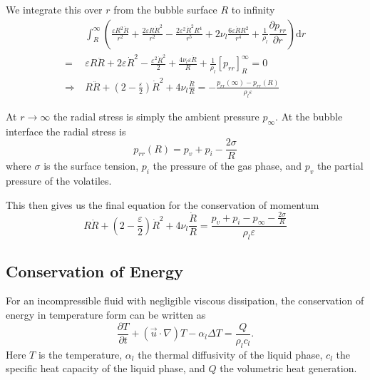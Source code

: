 \documentclass{article}
\numberwithin{equation}{section}
\newcommand{\dd}{\mathrm{d}}
\newcommand{\pd}[2]{\dfrac{\partial #1}{\partial #2}}
\begin{document}
We integrate this over $r$ from the bubble surface $R$ to infinity
\begin{equation}
    \begin{split}
        &\int_{R}^{\infty} \left(
            \frac{\varepsilon R^2 \ddot{R}}{r^2}
            + \frac{2 \varepsilon R \dot{R}^2}{r^2}
            - \frac{2 \varepsilon^2 \dot{R}^2 R^4}{r^5}
            + 2\nu_l \frac{6 \varepsilon \dot{R} R^2}{r^4}
            + \frac{1}{\rho_l} \pd{p_{rr}}{r}
        \right) \dd r \\
        =\ &
        \varepsilon R \ddot{R}
        + 2 \varepsilon \dot{R}^2
        - \frac{\varepsilon^2 \dot{R}^2}{2}
        + \frac{4\nu_l \varepsilon \dot{R}}{R}
        + \frac{1}{\rho_l} \left[p_{rr}\right]_R^\infty = 0 \\
        \Rightarrow\ &
        R \ddot{R}
        + \left(2 - \frac{\varepsilon}{2}\right)\dot{R}^2
        + 4\nu_l \frac{\dot{R}}{R}
        = -\frac{p_{rr}(\infty) - p_{rr}(R)}{\rho_l \varepsilon}
    \end{split}
\end{equation}

At $r \rightarrow \infty$ the radial stress is simply the ambient pressure $p_\infty$.
At the bubble interface the radial stress is
\begin{equation}
    p_{rr}(R) = p_v + p_i - \frac{2 \sigma}{R}
\end{equation}
where $\sigma$ is the surface tension,
$p_i$ the pressure of the gas phase, and
$p_v$ the partial pressure of the volatiles.

This then gives us the final equation for the conservation of momentum
\begin{equation}
    R \ddot{R}
    + \left(2 - \frac{\varepsilon}{2}\right)\dot{R}^2
    + 4\nu_l \frac{\dot{R}}{R}
    = \frac{p_v + p_i - p_\infty - \tfrac{2 \sigma}{R}}{\rho_l \varepsilon}
    \label{eq:spherically_symmetric_conservation_momentum}
\end{equation}

\subsection{Conservation of Energy}

For an incompressible fluid with negligible viscous dissipation,
the conservation of energy in temperature form can be written as
\begin{equation}
    \pd{T}{t}
    + \left(\vec{u} \cdot \nabla\right) T
    - \alpha_l \Delta T
    = \frac{Q}{\rho_l c_l}.
\end{equation}
Here $T$ is the temperature,
$\alpha_l$ the thermal diffusivity of the liquid phase,
$c_l$ the specific heat capacity of the liquid phase, and
$Q$ the volumetric heat generation.
\end{document}
